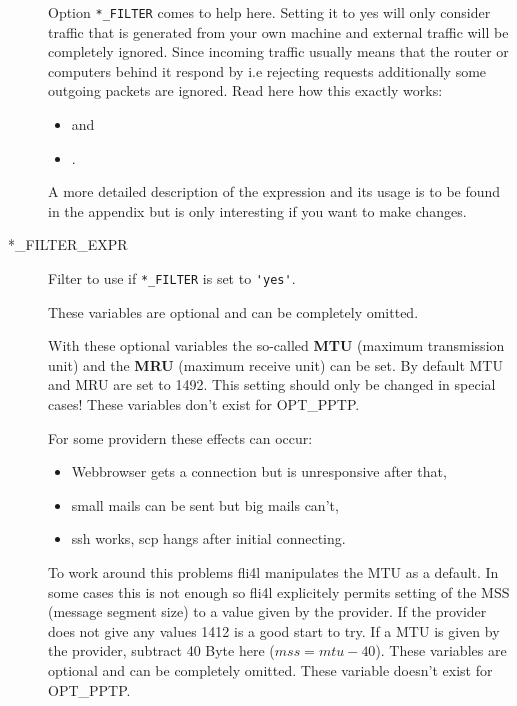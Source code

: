 \begin{description}
Option \verb*?*_FILTER? comes to help here. Setting it to yes will only
consider traffic that is generated from your own machine and
external traffic will be completely ignored. Since incoming traffic 
usually means that the router or computers behind it respond by i.e 
rejecting requests additionally some outgoing packets are ignored. 
Read here how this exactly works:
\begin{itemize}
\item {} and
\item {}.
\end{itemize}
A more detailed description of the expression and its usage is to be 
found in the appendix but is only interesting if you want to make 
changes.

\item[*\_FILTER\_EXPR]

Filter to use if \verb*?*_FILTER? is set to \verb*?'yes'?.

  
  These variables are optional and can be completely omitted.
  
  With these optional variables the so-called \textbf{MTU} (maximum
  transmission unit) and the \textbf{MRU} (maximum receive unit) can be
  set. By default MTU and MRU are set to 1492. This setting should only be 
  changed in special cases!
  These variables don't exist for OPT\_PPTP.


  For some providern these effects can occur:
  \begin{itemize}
  \item Webbrowser gets a connection but is unresponsive after that,
  \item small mails can be sent but big mails can't,
  \item ssh works, scp hangs after initial connecting.
  \end{itemize}

  To work around this problems fli4l manipulates the MTU as a default.
  In some cases this is not enough so fli4l explicitely permits setting 
  of the MSS (message segment size) to a value given by the provider. 
  If the provider does not give any values 1412 is a good start to try.
  If a MTU is given by the provider, subtract 40 Byte here ($mss = mtu - 40$).
  These variables are optional and can be completely omitted.
  These variable doesn't exist for OPT\_PPTP.

\end{description}
